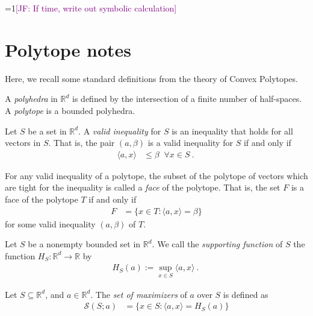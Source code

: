 \documentclass[anon]{colt2020} %
\newcommand{\Comments}{1}
\newcommand{\mynote}[2]{\ifnum\Comments=1\textcolor{#1}{#2}\fi}
\newcommand{\jessie}[1]{\mynote{purple}{[JF: #1]}}
\newcommand{\reals}{\mathbb{R}}
\newcommand{\inprod}[2]{\langle #1, #2 \rangle}%
\begin{document}
\jessie{If time, write out symbolic calculation}

\section{Polytope notes}
Here, we recall some standard definitions from the theory of Convex Polytopes.
\begin{definition}
	A \emph{polyhedra} in $\reals^d$ is defined by the intersection of a finite number of half-spaces.
	A \emph{polytope} is a bounded polyhedra.
\end{definition}

\begin{definition}
	Let $S$ be a set in $\reals^d$.
	A \emph{valid inequality} for $S$ is an inequality that holds for all vectors in $S$.
	That is, the pair $(a,\beta)$ is a valid inequality for $S$ if and only if 
	\begin{align*}
	\inprod{a}{x} &\leq \beta \; \; \forall x \in S~.~
	\end{align*}
\end{definition}

\begin{definition}[Face]\label{def:face}
	For any valid inequality of a polytope, the subset of the polytope of vectors which are tight for the inequality is called a \emph{face} of the polytope.
	That is, the set $F$ is a face of the polytope $T$ if and only if 
	\begin{align*}
	F &= \{x \in T : \inprod{a}{x} = \beta \}
	\end{align*}
	for some valid inequality $(a, \beta)$ of $T$.
\end{definition}

\begin{definition}
	Let $S$ be a nonempty bounded set in $\reals^d$.
	We call the \emph{supporting function} of $S$ the function $H_S:\reals^d \to \reals$ by
	\begin{align*}
	H_S(a) := \sup_{x \in S}\inprod{a}{x}~.~
	\end{align*} 
\end{definition}

\iffalse
\begin{definition}[Maximizers]
	Let $S \subseteq \reals^d$, and $a \in \reals^d$.
	The \emph{set of maximizers} of $a$ over $S$ is defined as
	\begin{align*}
	\mathcal{S}(S;a) &= \{x \in S : \inprod a x = H_S(a)\}
	\end{align*}
\end{definition}
\end{document}
